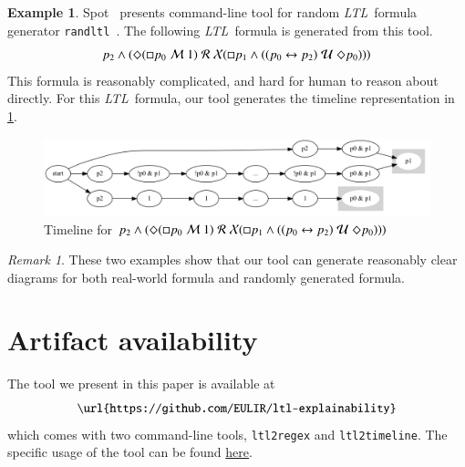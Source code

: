\documentclass[preprint,12pt]{elsarticle}
\theoremstyle{definition}
\newtheorem{example}{Example}[section]
\theoremstyle{remark}
\newtheorem{remark}{Remark}[section]
\newcommand{\always}{\Box}
\newcommand{\eventually}{\Diamond}
\newcommand{\nextt}{\mathcal{X}}
\newcommand{\ltl}{\textit{LTL}}
\newcommand{\stronguntil}{\hspace{0.1cm} \mathcal{U}  \hspace{0.1cm}}
\newcommand{\strongrelease}{\hspace{0.1cm} \mathcal{M} \hspace{0.1cm}}
\newcommand{\weakrelease}{\hspace{0.1cm} \mathcal{R} \hspace{0.1cm}}
\newcommand{\liff}{\leftrightarrow}
\begin{document}
\begin{example}
    Spot~\cite{SPOT-online} presents command-line tool for random \ltl\ formula generator \texttt{randltl}~\cite{duret.13.atva}. The following \ltl\ formula is generated from this tool.
    \[
    p_2 \land (\eventually (\always p_0 \strongrelease  1) \weakrelease \nextt(\always p_1 \land ((p_0 \liff p_2) \stronguntil \eventually p_0)))
    \]
    This formula is reasonably complicated, and hard for human to reason about directly. For this \ltl\ formula, our tool generates the timeline representation in \cref{fig:ex13}.
    \begin{figure}[h!]
        \centering
        \includegraphics[scale=0.3]{examples/ex13/ex13.png}
        \caption{Timeline for $p_2 \land (\eventually (\always p_0 \strongrelease  1) \weakrelease \nextt(\always p_1 \land ((p_0 \liff p_2) \stronguntil \eventually p_0)))$}
        \label{fig:ex13}
    \end{figure}
\end{example}
\begin{remark}
    These two examples show that our tool can generate reasonably clear diagrams for both real-world formula and randomly generated formula.
\end{remark}

\section{Artifact availability}
The tool we present in this paper is available at
\[
    \texttt{\url{https://github.com/EULIR/ltl-explainability}}
\]
which comes with two command-line tools, \texttt{ltl2regex} and \texttt{ltl2timeline}. The specific usage of the tool can be found  \href{https://github.com/EULIR/ltl-explainability#usage}{here}.
\end{document}
